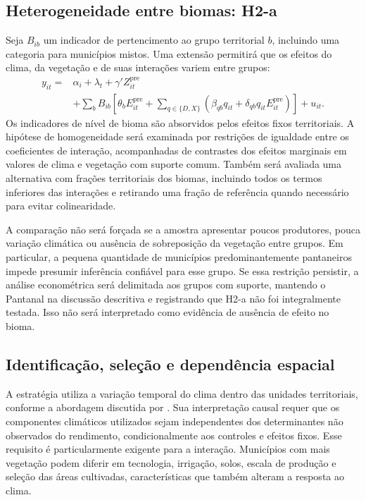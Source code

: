 \subsection{Heterogeneidade entre biomas: H2-a}

Seja $B_{ib}$ um indicador de pertencimento ao grupo territorial $b$, incluindo uma categoria para municípios mistos. Uma extensão permitirá que os efeitos do clima, da vegetação e de suas interações variem entre grupos:
\begin{align}
y_{it}={}&\alpha_i+\lambda_t+\gamma'Z^{\mathrm{pre}}_{it}\nonumber\\
&+\sum_b B_{ib}\left[\theta_b E^{\mathrm{pre}}_{it}
+\sum_{q\in\{D,X\}}\left(\beta_{qb}q_{it}
+\delta_{qb}q_{it}E^{\mathrm{pre}}_{it}\right)\right]+u_{it}.
\label{eq:h2biomas}
\end{align}
Os indicadores de nível de bioma são absorvidos pelos efeitos fixos territoriais. A hipótese de homogeneidade será examinada por restrições de igualdade entre os coeficientes de interação, acompanhadas de contrastes dos efeitos marginais em valores de clima e vegetação com suporte comum. Também será avaliada uma alternativa com frações territoriais dos biomas, incluindo todos os termos inferiores das interações e retirando uma fração de referência quando necessário para evitar colinearidade.

A comparação não será forçada se a amostra apresentar poucos produtores, pouca variação climática ou ausência de sobreposição da vegetação entre grupos. Em particular, a pequena quantidade de municípios predominantemente pantaneiros impede presumir inferência confiável para esse grupo. Se essa restrição persistir, a análise econométrica será delimitada aos grupos com suporte, mantendo o Pantanal na discussão descritiva e registrando que H2-a não foi integralmente testada. Isso não será interpretado como evidência de ausência de efeito no bioma.

\subsection{Identificação, seleção e dependência espacial}

A estratégia utiliza a variação temporal do clima dentro das unidades territoriais, conforme a abordagem discutida por . Sua interpretação causal requer que os componentes climáticos utilizados sejam independentes dos determinantes não observados do rendimento, condicionalmente aos controles e efeitos fixos. Esse requisito é particularmente exigente para a interação. Municípios com mais vegetação podem diferir em tecnologia, irrigação, solos, escala de produção e seleção das áreas cultivadas, características que também alteram a resposta ao clima.

